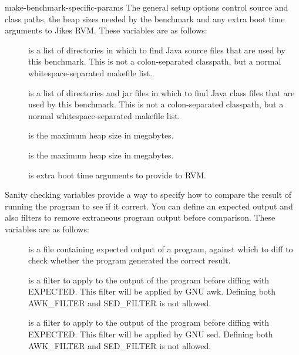 \begin{description}
\begin{Label}{make-benchmark-specific-params}
 The general setup options control source and class paths, the heap
sizes needed by the benchmark and any extra boot time arguments to
Jikes RVM.  These variables are as follows:
\begin{description}
\item[] is a list of directories in which to find
Java\TMweb{} source files that are used by this benchmark.  This is not a
colon-separated classpath, but a normal whitespace-separated makefile
list.  
\item[] is a list of directories and jar files in
which to find Java class files that are used by this benchmark.  This
is not a colon-separated classpath, but a normal whitespace-separated
makefile list.  
\item[] is the maximum heap size in megabytes.
\item[] is the maximum heap size in megabytes.
\item[] is extra boot time arguments to provide to
RVM. 
\end{description}

 Sanity checking variables provide a way to specify how to compare the
result of running the program to see if it correct.  You can define an
expected output and also filters to remove extraneous program output
before comparison.  These variables are as follows:
\begin{description}
\item[] is a file containing expected output of a program,
against which to diff to check whether the program generated the
correct result.
\item[] is a filter to apply to the output of the program
before diffing with EXPECTED.  This filter will be applied by GNU
awk. Defining both AWK\_FILTER and SED\_FILTER is not
allowed. 
\item[] is a filter to apply to the output of the program
before diffing with EXPECTED.  This filter will be applied by GNU sed.
Defining both AWK\_FILTER and SED\_FILTER is not allowed. 
\end{description}


\end{Label}
\end{description}
